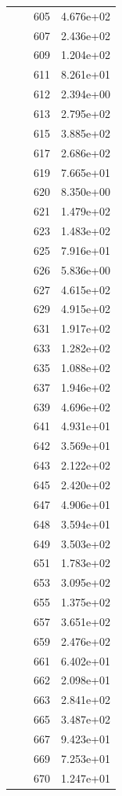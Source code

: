 \documentclass[12pt]{article}
\begin{document}
\begin{longtable}{@{}cccc@{}}
 &  & 605 & 4.676e+02 \\
 &  & 607 & 2.436e+02 \\
 &  & 609 & 1.204e+02 \\
 &  & 611 & 8.261e+01 \\
 &  & 612 & 2.394e+00 \\
 &  & 613 & 2.795e+02 \\
 &  & 615 & 3.885e+02 \\
 &  & 617 & 2.686e+02 \\
 &  & 619 & 7.665e+01 \\
 &  & 620 & 8.350e+00 \\
 &  & 621 & 1.479e+02 \\
 &  & 623 & 1.483e+02 \\
 &  & 625 & 7.916e+01 \\
 &  & 626 & 5.836e+00 \\
 &  & 627 & 4.615e+02 \\
 &  & 629 & 4.915e+02 \\
 &  & 631 & 1.917e+02 \\
 &  & 633 & 1.282e+02 \\
 &  & 635 & 1.088e+02 \\
 &  & 637 & 1.946e+02 \\
 &  & 639 & 4.696e+02 \\
 &  & 641 & 4.931e+01 \\
 &  & 642 & 3.569e+01 \\
 &  & 643 & 2.122e+02 \\
 &  & 645 & 2.420e+02 \\
 &  & 647 & 4.906e+01 \\
 &  & 648 & 3.594e+01 \\
 &  & 649 & 3.503e+02 \\
 &  & 651 & 1.783e+02 \\
 &  & 653 & 3.095e+02 \\
 &  & 655 & 1.375e+02 \\
 &  & 657 & 3.651e+02 \\
 &  & 659 & 2.476e+02 \\
 &  & 661 & 6.402e+01 \\
 &  & 662 & 2.098e+01 \\
 &  & 663 & 2.841e+02 \\
 &  & 665 & 3.487e+02 \\
 &  & 667 & 9.423e+01 \\
 &  & 669 & 7.253e+01 \\
 &  & 670 & 1.247e+01 \\

\end{longtable}
\end{document}
